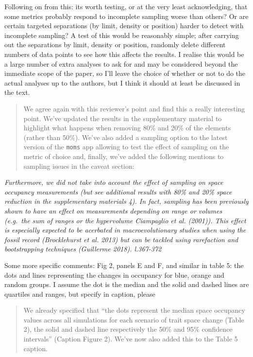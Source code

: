\documentclass[]{article}
\begin{document}
Following on from this: its worth testing, or at the very least
acknowledging, that some metrics probably respond to incomplete sampling
worse than others? Or are certain targeted separations (by limit,
density or position) harder to detect with incomplete sampling? A test
of this would be reasonably simple; after carrying out the separations
by limit, density or position, randomly delete different numbers of data
points to see how this affects the results. I realise this would be a
large number of extra analyses to ask for and may be considered beyond
the immediate scope of the paper, so I'll leave the choice of whether or
not to do the actual analyses up to the authors, but I think it should
at least be discussed in the text.

\begin{quote}
We agree again with this reviewer's point and find this a really
interesting point. We've updated the results in the supplementary
material to highlight what happens when removing 80\% and 20\% of the
elements (rather than 50\%). We've also added a sampling option to the
latest version of the \texttt{moms} app allowing to test the effect of
sampling on the metric of choice and, finally, we've added the following
mentions to sampling issues in the caveat section:
\end{quote}

\textit{Furthermore, we did not take into account the effect of sampling on
space occupancy measurements (but see additional results with 80\% and
20\% space reduction in the supplementary materials 4). In fact,
sampling has been previously shown to have an effect on measurements
depending on range or volumes (e.g.~the sum of ranges or the hypervolume
Ciampaglio et al. (2001)). This effect is especially expected to be
acerbated in macroevolutionary studies when using the fossil record
(Brocklehurst et al. 2013) but can be tackled using rarefaction and
bootstrapping techniques (Guillerme 2018). l.367-372}

Some more specific comments: Fig 2, panels E and F, and similar in table
5: the dots and lines representing the changes in occupancy for blue,
orange and random groups. I assume the dot is the median and the solid
and dashed lines are quartiles and ranges, but specify in caption,
please

\begin{quote}
We already specified that ``the dots represent the median space
occupancy values across all simulations for each scenario of trait space
change (Table 2), the solid and dashed line respectively the 50\% and
95\% confidence intervals'' (Caption Figure 2). We've now also added
this to the Table 5 caption.
\end{quote}
\end{document}
